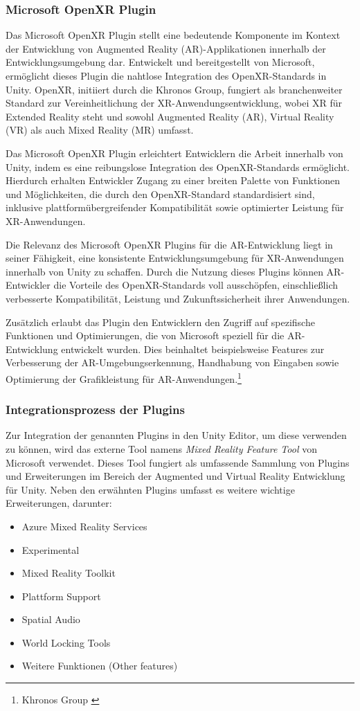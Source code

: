 \subsubsection{Microsoft OpenXR Plugin}
Das Microsoft OpenXR Plugin stellt eine bedeutende Komponente im Kontext der Entwicklung von Augmented Reality (AR)-Applikationen
innerhalb der Entwicklungsumgebung dar. Entwickelt und bereitgestellt von Microsoft, ermöglicht dieses Plugin die
nahtlose Integration des OpenXR-Standards in Unity. OpenXR, initiiert durch die Khronos Group, fungiert als branchenweiter
Standard zur Vereinheitlichung der XR-Anwendungsentwicklung, wobei XR für Extended Reality steht und sowohl Augmented
Reality (AR), Virtual Reality (VR) als auch Mixed Reality (MR) umfasst.

Das Microsoft OpenXR Plugin erleichtert Entwicklern die Arbeit innerhalb von Unity, indem es eine reibungslose Integration
des OpenXR-Standards ermöglicht. Hierdurch erhalten Entwickler Zugang zu einer breiten Palette von Funktionen und
Möglichkeiten, die durch den OpenXR-Standard standardisiert sind, inklusive plattformübergreifender Kompatibilität sowie
optimierter Leistung für XR-Anwendungen.

Die Relevanz des Microsoft OpenXR Plugins für die AR-Entwicklung liegt in seiner Fähigkeit, eine konsistente Entwicklungsumgebung
für XR-Anwendungen innerhalb von Unity zu schaffen. Durch die Nutzung dieses Plugins können AR-Entwickler die Vorteile
des OpenXR-Standards voll ausschöpfen, einschließlich verbesserte Kompatibilität, Leistung und Zukunftssicherheit ihrer Anwendungen.

Zusätzlich erlaubt das Plugin den Entwicklern den Zugriff auf spezifische Funktionen und Optimierungen, die von Microsoft
speziell für die AR-Entwicklung entwickelt wurden. Dies beinhaltet beispielsweise Features zur Verbesserung der
AR-Umgebungserkennung, Handhabung von Eingaben sowie Optimierung der Grafikleistung für AR-Anwendungen.\footnote{Khronos Group \cite{OpenXR Plugin}}

\subsubsection{Integrationsprozess der Plugins}
Zur Integration der genannten Plugins in
den Unity Editor, um diese verwenden zu können, wird das externe Tool namens \textit{Mixed Reality Feature Tool} von Microsoft verwendet. Dieses Tool
fungiert als umfassende Sammlung von Plugins und Erweiterungen im Bereich der Augmented und Virtual Reality Entwicklung
für Unity. Neben den erwähnten Plugins umfasst es weitere wichtige Erweiterungen, darunter:
\begin{itemize}
    \item Azure Mixed Reality Services
    \item Experimental
    \item Mixed Reality Toolkit
    \item Plattform Support
    \item Spatial Audio
    \item World Locking Tools
    \item Weitere Funktionen (Other features)
\end{itemize}

